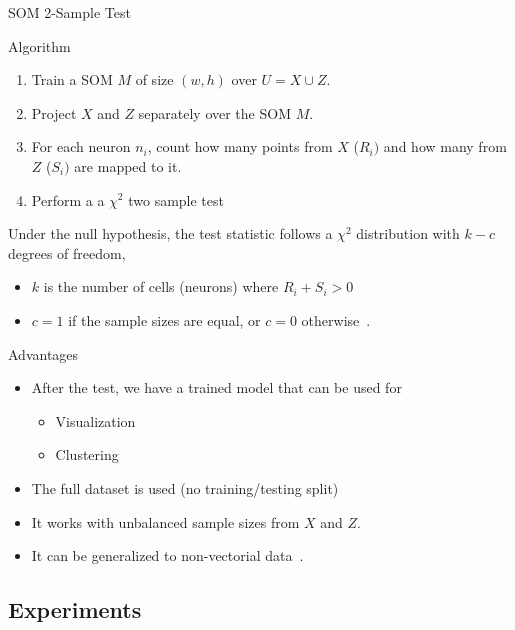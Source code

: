 \documentclass[10pt]{beamer}
\begin{document}
\begin{frame}{SOM 2-Sample Test}
    \begin{block}{Algorithm}
        \begin{enumerate}
        \item Train a SOM $M$ of size $(w, h)$ over $U = X \cup Z$.
        \item Project $X$ and $Z$ separately over the SOM  $M$.
        \item For each neuron $n_i$, count how many points from $X$ ($R_i)$ and how many from $Z$ ($S_i)$ are mapped to it.
        \item Perform a a $\chi^2$ two sample test
        \end{enumerate}

        Under the null hypothesis, the test statistic follows a $\chi^2$ distribution with $k - c$ degrees of freedom,
        \begin{itemize}
            \item $k$ is the number of cells (neurons) where ${R_i + S_i > 0}$
            \item $c = 1$ if the sample sizes are equal, or $c = 0$ otherwise~\cite{press1993numerical}.
        \end{itemize}        
    \end{block}
\end{frame}

\begin{frame}{Advantages}
    \begin{itemize}
        \item After the test, we have a trained model that can be used for
            
            \begin{itemize}
                \item Visualization
                \item Clustering~\cite{ultsch2005esom}
            \end{itemize}

        \item The full dataset is used (no training/testing split)
        \item It works with unbalanced sample sizes from $X$ and $Z$.
        \item It can be generalized to non-vectorial data~\cite{kohonen1982self}.
    \end{itemize}
\end{frame}

\subsection{Experiments}
\end{document}
